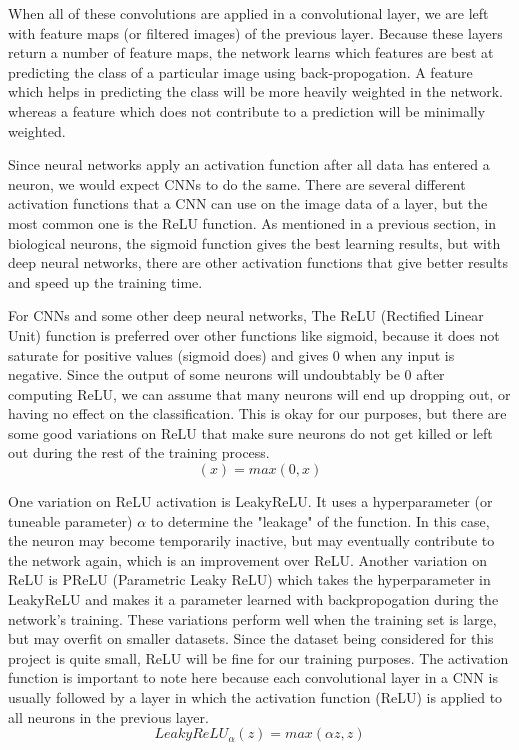\documentclass[12pt]{report} %
\begin{document}
	When all of these convolutions are applied in a convolutional layer, we are left with feature maps (or filtered images) of the previous layer. Because these layers return a number of feature maps, the network learns which features are best at predicting the class of a particular image using back-propogation. A feature which helps in predicting the class will be more heavily weighted in the network. whereas a feature which does not contribute to a prediction will be minimally weighted.
	
	Since neural networks apply an activation function after all data has entered a neuron, we would expect CNNs to do the same. There are several different activation functions that a CNN can use on the image data of a layer, but the most common one is the ReLU function. As mentioned in a previous section, in biological neurons, the sigmoid function gives the best learning results, but with deep neural networks, there are other activation functions that give better results and speed up the training time.\cite{krizhevsky2012imagenet} 
	
	For CNNs and some other deep neural networks, The ReLU (Rectified Linear Unit) function is preferred over other functions like sigmoid, because it does not saturate for positive values (sigmoid does) and gives 0 when any input is negative. Since the output of some neurons will undoubtably be 0 after computing ReLU, we can assume that many neurons will end up dropping out, or having no effect on the classification. This is okay for our purposes, but there are some good variations on ReLU that make sure neurons do not get killed or left out during the rest of the training process. \cite{aurelienMachineLearning} 
 \begin{equation}	
 (x) = max(0, x)%
 \end{equation}
 
	One variation on ReLU activation is LeakyReLU. It uses a hyperparameter (or tuneable parameter) \( \alpha \) to determine the "leakage" of the function. In this case, the neuron may become temporarily inactive, but may eventually contribute to the network again, which is an improvement over ReLU. Another variation on ReLU is PReLU (Parametric Leaky ReLU) which takes the hyperparameter in LeakyReLU and makes it a parameter learned with backpropogation during the network's training. These variations perform well when the training set is large, but may overfit on smaller datasets. Since the dataset being considered for this project is quite small, ReLU will be fine for our training purposes. The activation function is important to note here because each convolutional layer in a CNN is usually followed by a layer in which the activation function (ReLU) is applied to all neurons in the previous layer.\cite{aurelienMachineLearning} 
 \begin{equation}
LeakyReLU_\alpha(z) = max(\alpha z, z)
  \end{equation} 
  
\end{document}
